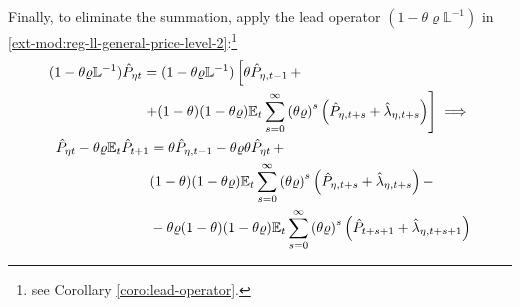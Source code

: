 \documentclass[../thesis.tex]{subfiles}
\begin{document}
Finally, to eliminate the summation, apply the lead operator $(1- \theta \varrho \mathbb{L}^{-1})$ in \ref{ext-mod:reg-ll-general-price-level-2}:\footnote{see Corollary \ref{coro:lead-operator}.}
\begin{align}
	\begin{split}
		(1- \theta \varrho \mathbb{L}^{-1}) \hat{P}_{\eta t} &= (1- \theta \varrho \mathbb{L}^{-1}) \left[ \theta \hat{P}_{\eta, t-1} \, + \right. \\
		&\left. + (1-\theta) (1- \theta \varrho) {\mathbb{E}_{t}} \sum_{s=0}^{\infty} \left( \theta \varrho \right)^s \left( \hat{P}_{\eta, t+s} + \hat{\lambda}_{\eta, t+s} \right) \right] \implies \nonumber
	\end{split} \\
	\begin{split}
		\hat{P}_{\eta t} - \theta \varrho {\mathbb{E}_{t}} \hat{P}_{t+1} &= \theta \hat{P}_{\eta, t-1} - \theta \varrho \theta \hat{P}_{\eta t} \, + \\
		& (1-\theta) (1- \theta \varrho) {\mathbb{E}_{t}} \sum_{s=0}^{\infty} \left( \theta \varrho \right)^s \left( \hat{P}_{\eta, t+s} + \hat{\lambda}_{\eta, t+s} \right) - \\
		& - \theta \varrho (1-\theta) (1- \theta \varrho) {\mathbb{E}_{t}} \sum_{s=0}^{\infty} \left( \theta \varrho \right)^s \left( \hat{P}_{t+s+1} + \hat{\lambda}_{\eta, t+s+1} \right)
	\end{split} \label{ext-mod:reg-ll-general-price-level-3}
\end{align}
\end{document}
